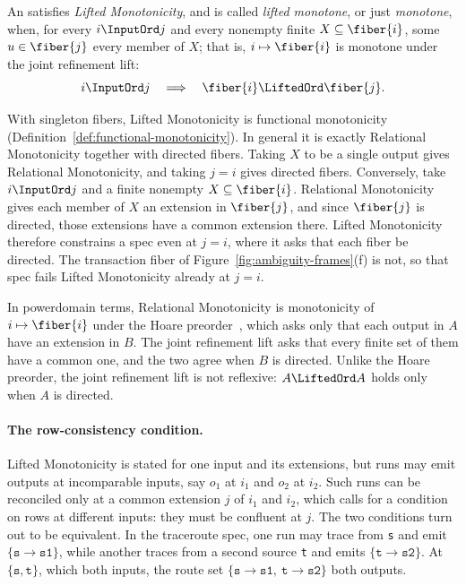 \begin{definition}
\label{def:lifted-monotonicity}
An \spectype satisfies \emph{Lifted Monotonicity}, and
is called \emph{lifted monotone}, or just \emph{monotone}, when, for every $i\InputOrd j$ and every nonempty
finite $X\subseteq\fiber{i}$, some $u\in\fiber{j}$ \outrel every member of $X$;
that is, $i\mapsto\fiber{i}$ is monotone under the joint refinement lift:
        \begin{equation}
  i\InputOrd j
  \quad\Longrightarrow\quad
  \fiber{i}\LiftedOrd\fiber{j}.
  \label{eq:lifted-monotonicity}
        \end{equation}
\end{definition}

With singleton fibers, Lifted Monotonicity is functional monotonicity
(Definition~\ref{def:functional-monotonicity}).  In general it is exactly
Relational Monotonicity together with directed fibers.  Taking $X$ to be a
single output gives Relational Monotonicity, and taking $j=i$ gives directed
fibers.  Conversely, take $i\InputOrd j$ and a finite nonempty
$X\subseteq\fiber{i}$.  Relational Monotonicity gives each member of $X$ an extension in $\fiber{j}$, and since $\fiber{j}$ is directed, those extensions have a common extension there.  Lifted Monotonicity therefore constrains a spec
even at $j=i$, where it asks that each fiber be directed.  The transaction
fiber of Figure~\ref{fig:ambiguity-frames}(f) is not, so that spec fails
Lifted Monotonicity already at $j=i$.

In powerdomain terms, Relational Monotonicity is monotonicity of
$i\mapsto\fiber{i}$ under the Hoare preorder~\cite{abramsky1994domain}, which
asks only that each output in $A$ have an extension in $B$.  The joint
refinement lift asks that every finite set of them have a common one, and the
two agree when $B$ is directed.  Unlike the Hoare preorder, the joint
refinement lift is not reflexive: $A\LiftedOrd A$ holds only when $A$ is
directed.

\paragraph{The row-consistency condition.}
Lifted Monotonicity is stated for one input and its extensions, but runs may
emit outputs at incomparable inputs, say $o_1$ at $i_1$ and $o_2$ at $i_2$.
Such runs can be reconciled only at a common extension $j$ of $i_1$ and $i_2$, which calls for a condition on rows at different inputs: they must be confluent at $j$.  The two conditions turn out to be equivalent.
In the traceroute spec, one run may trace from \texttt{s} and emit
$\{\texttt{s}{\to}\texttt{s1}\}$, while another traces from a second source
\texttt{t} and emits $\{\texttt{t}{\to}\texttt{s2}\}$.  At $\{\texttt{s},\texttt{t}\}$, which \inrel both inputs, the route set $\{\texttt{s}{\to}\texttt{s1},\ \texttt{t}{\to}\texttt{s2}\}$ \outrel both outputs.

